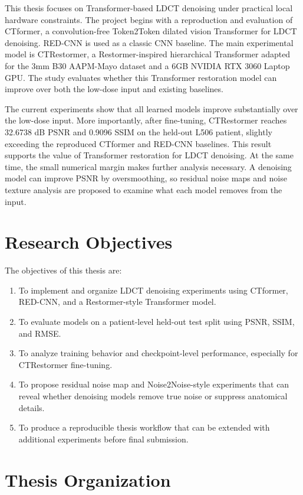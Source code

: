 \documentclass[12pt,a4paper]{report}
\begin{document}
This thesis focuses on Transformer-based LDCT denoising under practical local hardware constraints. The project begins with a reproduction and evaluation of CTformer, a convolution-free Token2Token dilated vision Transformer for LDCT denoising. RED-CNN is used as a classic CNN baseline. The main experimental model is CTRestormer, a Restormer-inspired hierarchical Transformer adapted for the 3mm B30 AAPM-Mayo dataset and a 6GB NVIDIA RTX 3060 Laptop GPU. The study evaluates whether this Transformer restoration model can improve over both the low-dose input and existing baselines.

The current experiments show that all learned models improve substantially over the low-dose input. More importantly, after fine-tuning, CTRestormer reaches 32.6738 dB PSNR and 0.9096 SSIM on the held-out L506 patient, slightly exceeding the reproduced CTformer and RED-CNN baselines. This result supports the value of Transformer restoration for LDCT denoising. At the same time, the small numerical margin makes further analysis necessary. A denoising model can improve PSNR by oversmoothing, so residual noise maps and noise texture analysis are proposed to examine what each model removes from the input.

\section{Research Objectives}

The objectives of this thesis are:

\begin{enumerate}[leftmargin=*]
\item To implement and organize LDCT denoising experiments using CTformer, RED-CNN, and a Restormer-style Transformer model.
\item To evaluate models on a patient-level held-out test split using PSNR, SSIM, and RMSE.
\item To analyze training behavior and checkpoint-level performance, especially for CTRestormer fine-tuning.
\item To propose residual noise map and Noise2Noise-style experiments that can reveal whether denoising models remove true noise or suppress anatomical details.
\item To produce a reproducible thesis workflow that can be extended with additional experiments before final submission.
\end{enumerate}

\section{Thesis Organization}
\end{document}

